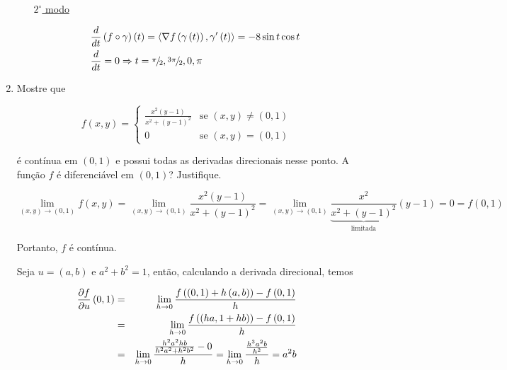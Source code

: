 \documentclass{book}
\begin{document}
\begin{enumerate}
\begin{sol}
\begin{enumerate}[(a)]
\uline{$2^\circ$ modo}

\[
\begin{gathered}
  \frac{d}
{{dt}}\left( {f \circ \gamma } \right)\left( t \right) = \left\langle {\nabla f\left( {\gamma \left( t \right)} \right),\gamma '\left( t \right)} \right\rangle  =  - 8\sin t\cos t \hfill \\
  \frac{d}
{{dt}} = 0 \Rightarrow t = {\raise0.5ex\hbox{$\scriptstyle \pi $}
\kern-0.1em/\kern-0.15em
\lower0.25ex\hbox{$\scriptstyle 2$}},{\raise0.5ex\hbox{$\scriptstyle {3\pi }$}
\kern-0.1em/\kern-0.15em
\lower0.25ex\hbox{$\scriptstyle 2$}},0,\pi  \hfill \\
\end{gathered}
\]


\end{enumerate}
\end{sol}

\item Mostre que

\begin{equation*}
f(x,y) = \left\{ \begin{array}{cl}\displaystyle
        \frac{{x^2(y-1)}}{{x^2 + (y-1)^2}} & \textrm{se }\left( {x,y} \right) \ne \left( {0,1} \right)\\
        0 & \textrm{se }\left( {x,y} \right) = \left( {0,1} \right)\end{array}\right.
\end{equation*}

\'e cont\'inua em $(0,1)$ e possui todas as derivadas direcionais nesse ponto. A fun\c{c}\~ao $f$ \'e diferenci\'avel em $(0,1)$? Justifique.

\begin{sol}
\[
\scriptstyle{
\mathop {\lim }\limits_{\left( {x,y} \right) \to \left( {0,1} \right)} f\left( {x,y} \right) = \mathop {\lim }\limits_{\left( {x,y} \right) \to \left( {0,1} \right)} \frac{{x^2 \left( {y - 1} \right)}}
{{x^2  + \left( {y - 1} \right)^2 }} = \mathop {\lim }\limits_{\left( {x,y} \right) \to \left( {0,1} \right)} \underbrace {\scriptstyle{\frac{x^2}{x^2  + \left( {y - 1} \right)^2}}}_{{\text{limitada}}}\left( {y - 1} \right) = 0 = f\left( {0,1} \right)
}
\]

Portanto, $f$ \'e cont\'inua.

Seja $u=(a,b)$ e $a^2+b^2=1$, ent\~ao, calculando a derivada direcional, temos


\begin{eqnarray*}
  \frac{{\partial f}}{{\partial u}}\left( {0,1} \right) &=& \mathop {\lim }\limits_{h \to 0} \frac{{f\left( {\left( {0,1} \right) + h\left( {a,b} \right)} \right) - f\left( {0,1} \right)}}{h} \hfill \\
   &=& \mathop {\lim }\limits_{h \to 0} \frac{{f\left( {\left( {ha,1 + hb} \right)} \right) - f\left( {0,1} \right)}}{h} \hfill \\
   &=& \mathop {\lim }\limits_{h \to 0} \frac{{\frac{{h^2 a^2 hb}}{{h^2 a^2  + h^2 b^2 }} - 0}}{h} = \mathop {\lim }\limits_{h \to 0} \frac{{\frac{{h^3 a^2 b}}{{h^2 }}}}{h} = a^2 b \hfill \\
\end{eqnarray*}


\end{sol}
\end{enumerate}
\end{document}
